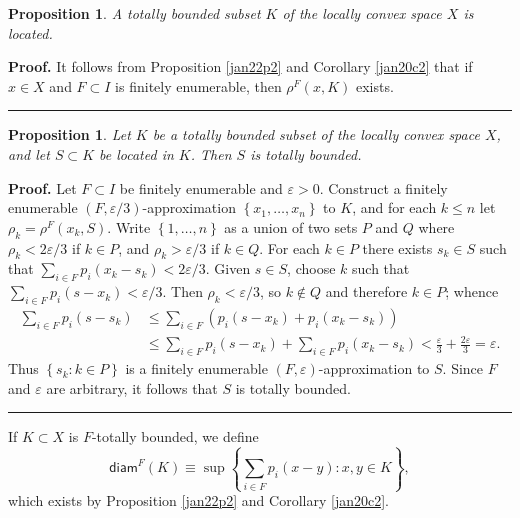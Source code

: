 \documentclass{article}%
\newtheorem{proposition}[theorem]{Proposition}
\newenvironment{proof}[1][Proof]{\noindent\textbf{#1.} }{\ \rule{0.5em}{0.5em}}
\begin{document}
\begin{proposition}
\label{jan22p1}A totally bounded subset $K$ of the locally convex space $X$ is located.
\end{proposition}

\begin{proof}
It follows from Proposition \ref{jan22p2} and Corollary \ref{jan20c2} that if
$x\in X$ and $F\subset I$ is finitely enumerable, then $\rho^{F}(x,K)$ exists.
\end{proof}

\begin{proposition}
\label{jan23p1}Let $K$ be a totally bounded subset of the locally convex space
$X$, and let $S\subset K$ be located in $K$. Then $S$ is totally bounded.
\end{proposition}

\begin{proof}
Let $F\subset I$ be finitely enumerable and $\varepsilon>0$. Construct a
finitely enumerable $\left(  F,\varepsilon/3\right)  $-approximation $\left\{
x_{1},\ldots,x_{n}\right\}  $ to $K$, and for each $k\leq n$ let $\rho
_{k}=\rho^{F}(x_{k},S)$. Write $\left\{  1,\ldots,n\right\}  $ as a union of
two sets $P$ and $Q$ where $\rho_{k}<2\varepsilon/3$ if $k\in P$, and
$\rho_{k}>\varepsilon/3$ if $k\in Q$. For each $k\in P$ there exists $s_{k}\in
S$ such that $\sum_{i\in F}p_{i}(x_{k}-s_{k})<2\varepsilon/3$. Given $s\in S$,
choose $k$ such that $\sum_{i\in F}p_{i}(s-x_{k})<\varepsilon/3$. Then
$\rho_{k}<\varepsilon/3$, so $k\notin Q$ and therefore $k\in P$; whence
\begin{align*}
\sum_{i\in F}p_{i}(s-s_{k}) &  \leq\sum_{i\in F}\left(  p_{i}(s-x_{k}%
)+p_{i}(x_{k}-s_{k})\right)  \\
&  \leq\sum_{i\in F}p_{i}(s-x_{k})+\sum_{i\in F}p_{i}(x_{k}-s_{k}%
)<\frac{\varepsilon}{3}+\frac{2\varepsilon}{3}=\varepsilon.
\end{align*}
Thus $\left\{  s_{k}:k\in P\right\}  $ is a finitely enumerable $\left(
F,\varepsilon\right)  $-approximation to $S$. Since $F$ and $\varepsilon$ are
arbitrary, it follows that $S$ is totally bounded.
\end{proof}

%

\bigskip


If $K\subset X$ is $F$-totally bounded, we define%
\[
\mathsf{diam}^{F}(K)\equiv\sup\left\{  \sum_{i\in F}p_{i}(x-y):x,y\in
K\right\}  ,
\]
which exists by Proposition \ref{jan22p2} and Corollary \ref{jan20c2}.
\end{document}
